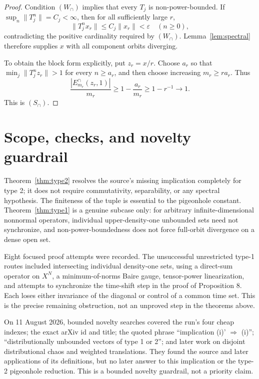 \documentclass[11pt]{article}
\begin{document}
\begin{proof}
Condition $(W_\cap)$ implies that every $T_j$ is non-power-bounded.  If
$\sup_n\|T_j^n\|=C_j<\infty$, then for all sufficiently large $r$,
\[
 \|T_j^nx_r\|\leq C_j\|x_r\|<\varepsilon
 \quad(n\geq0),
\]
contradicting the positive cardinality required by $(W_\cap)$.
Lemma~\ref{lem:spectral} therefore supplies $x$ with all component orbits
diverging.

To obtain the block form explicitly, put $z_r=x/r$.  Choose $a_r$ so that
$\min_j\|T_j^nz_r\|>1$ for every $n\geq a_r$, and then choose increasing
$m_r\geq r a_r$.  Thus
\[
 \frac{|E_{m_r}^\cap(z_r,1)|}{m_r}
 \geq1-\frac{a_r}{m_r}\geq1-r^{-1}\longrightarrow1.
\]
This is $(S_\cap)$.
\end{proof}

\section{Scope, checks, and novelty guardrail}

Theorem~\ref{thm:type2} resolves the source's missing implication completely
for type 2; it does not require commutativity, separability, or any spectral
hypothesis.  The finiteness of the tuple is essential to the pigeonhole
constant.  Theorem~\ref{thm:type1} is a genuine subcase only: for arbitrary
infinite-dimensional nonnormal operators, individual upper-density-one
unbounded sets need not synchronize, and non-power-boundedness does not force
full-orbit divergence on a dense open set.

Eight focused proof attempts were recorded.  The unsuccessful unrestricted
type-1 routes included intersecting individual density-one sets, using a
direct-sum operator on $X^N$, a minimum-of-norms Baire gauge, tensor-power
linearization, and attempts to synchronize the time-shift step in the proof
of Proposition 8.  Each loses either invariance of the diagonal or control of
a common time set.  This is the precise remaining obstruction, not an
unproved step in the theorems above.

On 11 August 2026, bounded novelty searches covered the run's four cheap
indexes; the exact arXiv id and title; the quoted phrase ``implication (i)'
$\Rightarrow$ (i)''; ``distributionally unbounded vectors of type 1 or 2'';
and later work on disjoint distributional chaos and weighted translations.
They found the source and later applications of its definitions, but no later
answer to this implication or the type-2 pigeonhole reduction.  This is a
bounded novelty guardrail, not a priority claim.
\end{document}
